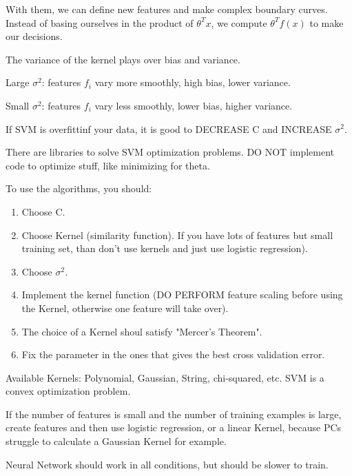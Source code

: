 \documentclass[12pt,a4paper]{report}
\begin{document}
	With them, we can define new features and make complex boundary curves. Instead of basing ourselves in the product of $\theta^Tx$, we compute $\theta^Tf(x)$ to make our decisions. 
	
	The variance of the kernel plays over bias and variance. 
	
	Large $\sigma^2$: features $f_i$ vary more smoothly, high bias, lower variance.
	
	Small $\sigma^2$: features $f_i$ vary less smoothly, lower bias, higher variance.
	
	If SVM is overfittinf your data, it is good to DECREASE C and INCREASE $\sigma^2$.
	
	There are libraries to solve SVM optimization problems. DO NOT  implement code to optimize stuff, like minimizing for theta.
	
	To use the algorithms, you should:
	\begin{enumerate}
	\item Choose C.
	\item Choose Kernel (similarity function). If you have lots of features but small training set, than don't use kernels and just use logistic regression).
	\item Choose $\sigma^2$.
	\item Implement the kernel function (DO PERFORM feature scaling before using the Kernel, otherwise one feature will take over).
	\item The choice of a Kernel shoul satisfy "Mercer's Theorem".
	\item Fix the parameter in the ones that gives the best cross validation error.
	\end{enumerate}
	
	Available Kernels: Polynomial, Gaussian, String, chi-squared, etc. SVM is a convex optimization problem.
	
	If the number of features is small and the number of training examples is large, create features and then use logistic regression, or a linear Kernel, because PCs struggle to calculate a Gaussian Kernel for example.
	
	Neural Network should work in all conditions, but should be slower to train.
	
\end{document}
